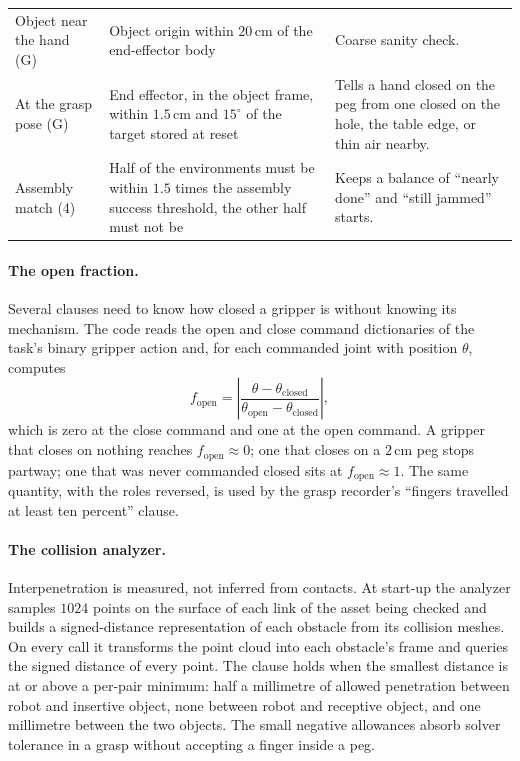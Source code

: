 \documentclass{article}
\begin{document}
\begin{table}[t]
\begin{tabular}{@{}p{2.4cm}p{6.0cm}p{4.5cm}@{}}
Object near the hand (G) & Object origin within $20$\,cm of the end-effector body & Coarse sanity check.\\
At the grasp pose (G) & End effector, in the object frame, within $1.5$\,cm and $15^\circ$ of the target stored at reset & Tells a hand closed on the peg from one closed on the hole, the table edge, or thin air nearby.\\
Assembly match (4) & Half of the environments must be within $1.5$ times the assembly success threshold, the other half must not be & Keeps a balance of ``nearly done'' and ``still jammed'' starts.\\
\bottomrule
\end{tabular}
\end{table}

\paragraph{The open fraction.}
Several clauses need to know how closed a gripper is without knowing its mechanism. The code reads the open and close command dictionaries of the task's binary gripper action and, for each commanded joint with position $\theta$, computes
\begin{equation}
  f_{\text{open}} = \left|\frac{\theta-\theta_{\text{closed}}}{\theta_{\text{open}}-\theta_{\text{closed}}}\right| ,
  \label{eq:open}
\end{equation}
which is zero at the close command and one at the open command. A gripper that closes on nothing reaches $f_{\text{open}}\approx0$; one that closes on a $2$\,cm peg stops partway; one that was never commanded closed sits at $f_{\text{open}}\approx1$. The same quantity, with the roles reversed, is used by the grasp recorder's ``fingers travelled at least ten percent'' clause.

\paragraph{The collision analyzer.}
Interpenetration is measured, not inferred from contacts. At start-up the analyzer samples $1024$ points on the surface of each link of the asset being checked and builds a signed-distance representation of each obstacle from its collision meshes. On every call it transforms the point cloud into each obstacle's frame and queries the signed distance of every point. The clause holds when the smallest distance is at or above a per-pair minimum: half a millimetre of allowed penetration between robot and insertive object, none between robot and receptive object, and one millimetre between the two objects. The small negative allowances absorb solver tolerance in a grasp without accepting a finger inside a peg.
\end{document}
